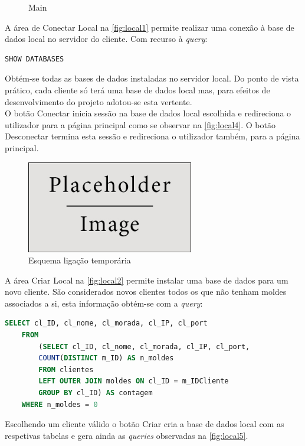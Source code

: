 \documentclass[11pt,twoside,a4paper]{report}
\begin{document}
\begin{figure}[H]
\begin{minipage}{.5\textwidth}
\begin{center}
			\label{fig:local3}
		\end{center}
	\end{minipage}
	\caption{Main}
	\label{fig:local0}
\end{figure}
A área de Conectar Local na \autoref{fig:local1} permite realizar uma conexão à base de dados local no servidor do cliente. Com recurso à \textit{query}:
\begin{lstlisting}[language = SQL]
	SHOW DATABASES
\end{lstlisting}
Obtém-se todas as bases de dados instaladas no servidor local. Do ponto de vista prático, cada cliente só terá uma base de dados local mas, para efeitos de desenvolvimento do projeto adotou-se esta vertente.\\
O botão Conectar inicia sessão na base de dados local escolhida e redireciona o utilizador para a página principal como se observar na \autoref{fig:local4}. O botão Desconectar termina esta sessão e redireciona o utilizador também, para a página principal.
\begin{figure}[H]
	\begin{center}
		\includegraphics[width=0.65\textwidth]{placeholder} %
		\caption{Esquema ligação temporária}
		\label{fig:local4}
	\end{center}
\end{figure}
A área Criar Local na \autoref{fig:local2} permite instalar uma base de dados para um novo cliente. São considerados novos clientes todos os que não tenham moldes associados a si, esta informação obtém-se com a \textit{query}:
\begin{lstlisting}[language = SQL]
	SELECT cl_ID, cl_nome, cl_morada, cl_IP, cl_port
	FROM
		(SELECT cl_ID, cl_nome, cl_morada, cl_IP, cl_port,
		COUNT(DISTINCT m_ID) AS n_moldes
		FROM clientes
		LEFT OUTER JOIN moldes ON cl_ID = m_IDCliente
		GROUP BY cl_ID) AS contagem
	WHERE n_moldes = 0
\end{lstlisting}
Escolhendo um cliente válido o botão Criar cria a base de dados local com as respetivas tabelas e gera ainda as \textit{queries} observadas na \autoref{fig:local5}.
\end{document}
